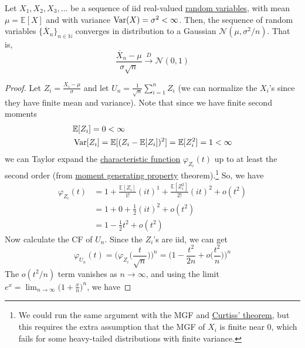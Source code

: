   \begin{theorem}
    \label{thm:central-limit-theorem}
    Let $X_1, X_2, X_3, \ldots$ be a sequence of iid real-valued \hyperref[def:random-variable]{random variables}, with mean $\mu = \mathbb{E}[X]$ and with variance $\operatorname{Var}(X) = \sigma^2 < \infty$. Then, the sequence of random variables $\{\overline{X}_n\}_{n \in \mathbb{N}}$ converges in distribution to a Gaussian $\mathcal{N}(\mu, \sigma^2 / n)$. That is, 
    \begin{equation}
      \frac{\overline{X}_n - \mu}{\sigma \sqrt{n}} \xrightarrow{D} \mathcal{N}(0, 1)
    \end{equation}
  \end{theorem}
  \begin{proof}
    Let $Z_i = \frac{X_i - \mu}{\sigma}$ and let $U_n = \frac{1}{\sqrt{n}} \sum_{i=1}^n Z_i$ (we can normalize the $X_i$'s since they have finite mean and variance). Note that since we have finite second moments 
    \begin{align*}
      & \mathbb{E}[Z_i] = 0 < \infty \\
      & \operatorname{Var}[Z_i] = \mathbb{E}[ (Z_i - \mathbb{E}[Z_i])^2] = \mathbb{E}[Z_i^2] = 1 < \infty 
    \end{align*}
    we can Taylor expand the \hyperref[def:characteristic-function]{characteristic function} $\varphi_{Z_i} (t)$ up to at least the second order (from \hyperref[thm:moment-generating-property-2]{moment generating property} theorem).\footnote{We could run the same argument with the MGF and \hyperref[thm:curtiss-theorem]{Curtiss' theorem}, but this requires the extra assumption that the MGF of $X_i$ is finite near $0$, which fails for some heavy-tailed distributions with finite variance.} So, we have 
    \begin{align*}
      \varphi_{Z_i} (t) & = 1 + \frac{\mathbb{E}[Z_i]}{1!} (i t)^1 + \frac{\mathbb{E}[Z_i^2]}{2!} (i t)^2 + o (t^2) \\
      & = 1 + 0 + \frac{1}{2} (i t)^2 + o (t^2) \\
      & = 1 - \frac{1}{2} t^2 + o(t^2) 
    \end{align*}
    Now calculate the CF of $U_n$. Since the $Z_i$'s are iid, we can get 
    \begin{equation}
      \varphi_{U_n} (t) = \Big( \varphi_{Z_i} \big( \frac{t}{\sqrt{n}} \big) \Big)^n = \Big( 1 - \frac{t^2}{2n} + o \big( \frac{t^2}{n} \big) \Big)^n
    \end{equation}
    The $o(t^2 / n)$ term vanishes as $n \rightarrow \infty$, and using the limit $e^x = \lim_{n \rightarrow \infty} \big( 1 + \frac{x}{n} \big)^n$, we have 

\end{proof}
